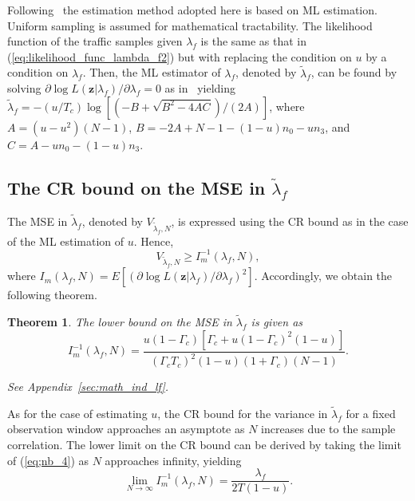 \documentclass[11pt,draftclsnofoot,journal,onecolumn]{IEEEtran}
\newtheorem{theorem}{Theorem}
\begin{document}
Following~\cite[Sec. 6.1]{kim_tmc_2008} the estimation method adopted here is based on ML estimation. Uniform sampling is assumed for mathematical tractability. The likelihood function of the traffic samples given $\lambda_f$ is the same as that in (\ref{eq:likelihood_func_lambda_f2}) but with replacing the condition on $u$ by a condition on $\lambda_f$. Then, the ML estimator of $\lambda_f$, denoted by $\tilde\lambda_f$, can be found by solving $\partial \log L(\boldsymbol{z}|\lambda_{f})/ \partial \lambda_f = 0$ as in~\cite[Sec. 6.1]{kim_tmc_2008} yielding $\tilde\lambda_f=-\left(u/T_c\right)\log\left[\left(-B+\sqrt{B^2-4AC}\right)/\left(2A\right)\right]$, where $A=(u-u^2)(N-1)$, $B=-2A+N-1-(1-u)n_0-un_3$, and $C=A-un_0-(1-u)n_3$.

\subsection{The CR bound on the MSE in $\tilde\lambda_{f}$}
\label{sec:lambda_f_estimation_error}

The MSE in $\tilde\lambda_{f}$, denoted by $V_{\tilde{\lambda}_f,N}$, is expressed using the CR bound as in the case of the ML estimation of $u$. Hence, 
\begin{equation}
V_{\tilde{\lambda}_f,N} \geq I_m^{-1}\left(\lambda_f,N\right),
\label{eq;lf_cr1}
\end{equation}
where $I_m\left(\lambda_f,N\right) = E\left[\left(\partial\log L(\boldsymbol{z}|\lambda_{f})/\partial\lambda_{f}\right)^2\right]$. Accordingly, we obtain the following theorem.
\begin{theorem}
The lower bound on the MSE in $\tilde\lambda_f$ is given as
\begin{equation}
I_m^{-1}\left(\lambda_f,N\right) = \frac{u(1-\Gamma_c)[\Gamma_c+u(1-\Gamma_c)^2(1-u)]}{\left(\Gamma_c T_c\right)^2 (1-u)(1+\Gamma_c)(N-1)}.
\label{eq;nb_4}
\end{equation}
\begin{IEEEproof}
See Appendix~\ref{sec:math_ind_lf}.
\end{IEEEproof}
\end{theorem}
As for the case of estimating $u$, the CR bound for the variance in $\tilde\lambda_f$ for a fixed observation window approaches an asymptote as $N$ increases due to the sample correlation. The lower limit on the CR bound can be derived by taking the limit of (\ref{eq;nb_4}) as $N$ approaches infinity, yielding
\begin{equation}
\lim_{N\to\infty} I_m^{-1}\left(\lambda_f,N\right) = \frac{\lambda_f}{2T\left(1-u\right)}.
\label{eq;nb_5}
\end{equation}
\end{document}
